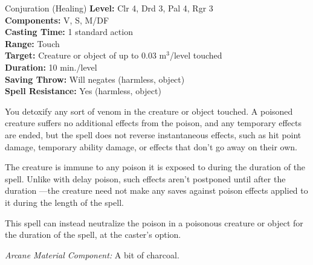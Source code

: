{Conjuration (Healing)}
{
	\textbf{Level:}
	Clr 4, Drd 3, Pal 4, Rgr 3\\
	\textbf{Components:}
	V, S, M/DF\\
	\textbf{Casting Time:}
	1 standard action\\
	\textbf{Range:}
	Touch\\
	\textbf{Target:}
	Creature or object of up to 0.03 m$^3$/level touched\\
	\textbf{Duration:}
	10 min./level\\
	\textbf{Saving Throw:}
	Will negates (harmless, object)\\
	\textbf{Spell Resistance:}
	Yes (harmless, object)\\
}
{
	You detoxify any sort of venom in the creature or object touched. A poisoned creature suffers no additional effects from the poison, and any temporary effects are ended, but the spell does not reverse instantaneous effects, such as hit point damage, temporary ability damage, or effects that don't go away on their own.

	The creature is immune to any poison it is exposed to during the duration of the spell. Unlike with delay poison, such effects aren't postponed until after the duration ---the creature need not make any saves against poison effects applied to it during the length of the spell.

	This spell can instead neutralize the poison in a poisonous creature or object for the duration of the spell, at the caster's option.

	\textit{Arcane Material Component:}
	A bit of charcoal.

}
